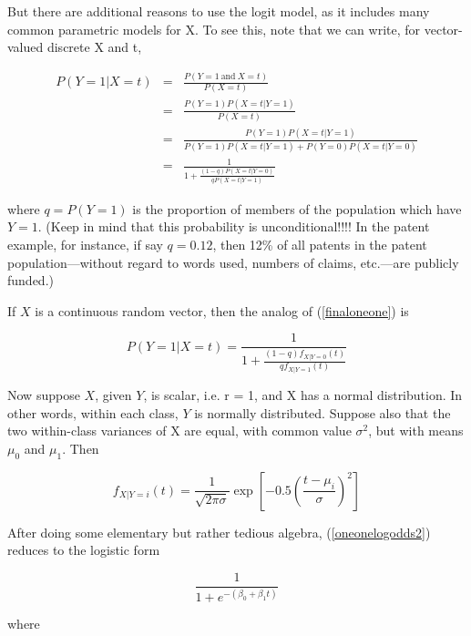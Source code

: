 But there are additional reasons to use the logit model, as it includes
many common parametric models for X.  To see this, note that we can
write, for vector-valued discrete X and t,

\begin{eqnarray}
\label{oneonelogodds}
P(Y = 1 | X = t) &=&  \frac{P(Y = 1 ~ \textrm{and} ~ X = t)}{P(X = t)} \\
&=& \frac{P(Y = 1) P(X = t | Y = 1)}{P(X = t)} \\
&=& \frac{P(Y = 1) P(X = t | Y = 1)}
{P(Y = 1) P(X = t | Y = 1) + P(Y = 0) P(X = t | Y = 0)} \\
\label{intermedone}
&=& \frac{1}
{1 + \frac{(1-q) P(X = t | Y = 0)}{q P(X = t | Y = 1)}}
\label{finaloneone}
\end{eqnarray}

where $q = P(Y = 1)$ is the proportion of members of the population which
have $Y = 1$.  (Keep in mind that this probability is unconditional!!!!
In the patent example, for instance, if say $q = 0.12$, then 12\% of all
patents in the patent population---without regard to words used, numbers
of claims, etc.---are publicly funded.) 


If $X$ is a continuous random vector, then the analog of
(\ref{finaloneone}) is

\begin{equation}
\label{oneonelogodds2}
P(Y = 1 | X = t) = \frac{1}
{1 + \frac{(1-q) f_{X|Y=0}(t)}{q f_{X|Y=1}(t)}}
\end{equation}

Now suppose $X$, given $Y$, is scalar, i.e. r = 1,  and X has a normal
distribution.  In other words, within each class, $Y$ is normally
distributed.  Suppose also that the two within-class variances of X are
equal, with common value $\sigma^2$, but with means $\mu_0$ and
$\mu_1$.  Then

\begin{equation}
f_{X|Y=i}(t) = \frac{1}{\sqrt{2\pi\sigma}}
\exp{\left [ -0.5 \left (\frac{t-\mu_i}{\sigma} \right )^2 \right ]}
\end{equation}

After doing some elementary but rather tedious algebra,
(\ref{oneonelogodds2}) reduces to the logistic form

\begin{equation}
\frac{1}{1+e^{-(\beta_0 + \beta_1 t)}}
\end{equation}

where 

